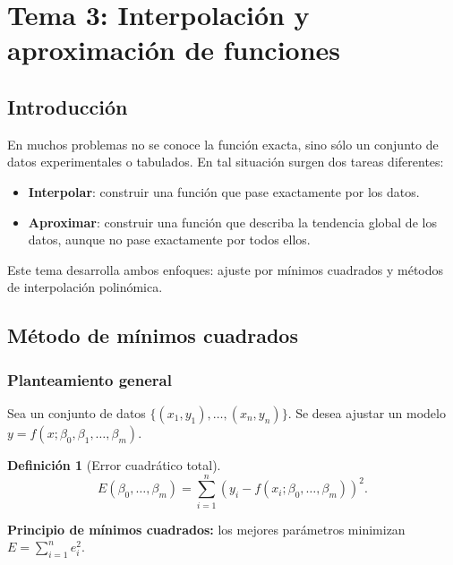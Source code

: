 \documentclass[a4paper,12pt]{article}
\theoremstyle{definition}
\newtheorem{definicion}{Definición}[section]
\theoremstyle{plain}
\begin{document}
\newpage

\section{Tema 3: Interpolación y aproximación de funciones}

\subsection{Introducción}

En muchos problemas no se conoce la función exacta, sino sólo un conjunto de
datos experimentales o tabulados. En tal situación surgen dos tareas
diferentes:

\begin{itemize}[leftmargin=1.5em]
    \item \textbf{Interpolar}: construir una función que pase exactamente por
          los datos.
    \item \textbf{Aproximar}: construir una función que describa la tendencia
          global de los datos, aunque no pase exactamente por todos ellos.
\end{itemize}

Este tema desarrolla ambos enfoques: ajuste por mínimos cuadrados y métodos
de interpolación polinómica.

\subsection{Método de mínimos cuadrados}

\subsubsection{Planteamiento general}

Sea un conjunto de datos $\{(x_1,y_1),\dots,(x_n,y_n)\}$.
Se desea ajustar un modelo $y=f(x;\beta_0,\beta_1,\dots,\beta_m)$.

\begin{definicion}[Error cuadrático total]
\[
E(\beta_0,\dots,\beta_m)=\sum_{i=1}^n \left(y_i-f(x_i;\beta_0,\dots,\beta_m)
\right)^2.
\]
\end{definicion}

\begin{cajaresultado}
\textbf{Principio de mínimos cuadrados:} los mejores parámetros minimizan
$E = \sum_{i=1}^n e_i^2$.
\end{cajaresultado}
\end{document}
